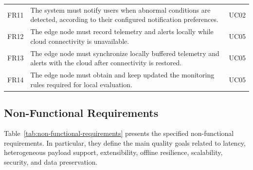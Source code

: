 \begin{table}[H]
\begin{tabularx}{\textwidth}{l X l}
        FR11        & The system must notify users when abnormal conditions are detected, according to their configured notification preferences.                 & UC02           \\
        FR12        & The edge node must record telemetry and alerts locally while cloud connectivity is unavailable.                                             & UC05           \\
        FR13        & The edge node must synchronize locally buffered telemetry and alerts with the cloud after connectivity is restored.                         & UC05           \\
        FR14        & The edge node must obtain and keep updated the monitoring rules required for local evaluation.                                              & UC05           \\
        \bottomrule
    \end{tabularx}
\end{table}

\subsection{Non-Functional Requirements}

Table~\ref{tab:non-functional-requirements} presents the specified
non-functional requirements. In particular, they define the main quality goals
related to latency, heterogeneous payload support, extensibility, offline
resilience, scalability, security, and data preservation.

